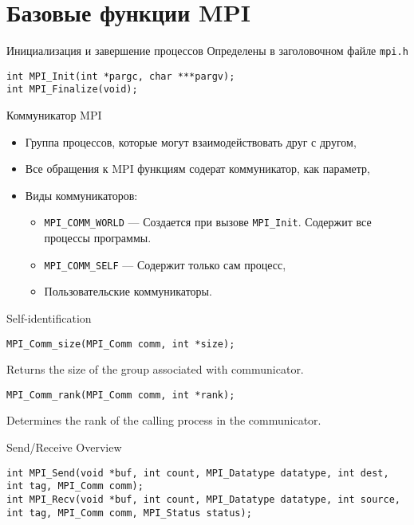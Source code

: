 \section{Базовые функции MPI}

\begin{frame}[fragile]{Инициализация и завершение процессов}
Определены в заголовочном файле \texttt{mpi.h}
\vfill
\begin{lstlisting}
int MPI_Init(int *pargc, char ***pargv);
int MPI_Finalize(void);
\end{lstlisting}
\end{frame}

\begin{frame}{Коммуникатор MPI}
\begin{itemize}
    \item Группа процессов, которые могут взаимодействовать друг с другом,
    \item Все обращения к MPI функциям содерат коммуникатор, как параметр,
    \vfill
    \item Виды коммуникаторов:
    \begin{itemize}
        \item \texttt{MPI_COMM_WORLD} --- Создается при вызове \texttt{MPI_Init}.
        Содержит все процессы программы.
        \item \texttt{MPI_COMM_SELF} --- Содержит только сам процесс,
        \item Пользовательские коммуникаторы.
    \end{itemize}
\end{itemize}
\end{frame}

\begin{frame}[fragile]{Self-identification}

\begin{lstlisting}
MPI_Comm_size(MPI_Comm comm, int *size);
\end{lstlisting}

Returns the size of the group associated with communicator.

\vfill

\begin{lstlisting}
MPI_Comm_rank(MPI_Comm comm, int *rank);
\end{lstlisting}

Determines the rank of the calling process in the communicator.

\end{frame}

\begin{frame}[fragile]{Send/Receive Overview}

\begin{lstlisting}
int MPI_Send(void *buf, int count, MPI_Datatype datatype, int dest, int tag, MPI_Comm comm);
int MPI_Recv(void *buf, int count, MPI_Datatype datatype, int source, int tag, MPI_Comm comm, MPI_Status status);
\end{lstlisting}

\end{frame}

